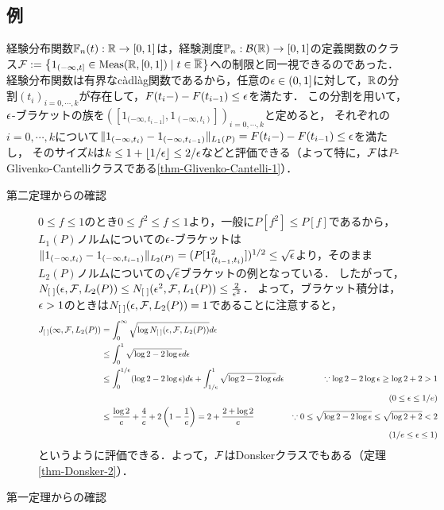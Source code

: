 \documentclass[uplatex,dvipdfmx]{jsreport}
\begin{document}
\subsection{例}

\begin{example}[区間の定義関数クラス]
    経験分布関数$\mathbb{F}_n(t):\mathbb{R}\to[0,1]$は，経験測度$\mathbb{P}_n:\mathcal{B}(\mathbb{R})\to[0,1]$の定義関数のクラス$\mathcal{F}:=\left\{1_{(-\infty,t]}\in\mathrm{Meas}(\mathbb{R},[0,1])\mid t\in\overline{\mathbb{R}}\right\}$への制限と同一視できるのであった．
    経験分布関数は有界なcàdlàg関数であるから，任意の$\epsilon\in(0,1]$に対して，$\mathbb{R}$の分割$(t_i)_{i=0,\cdots,k}$が存在して，$F(t_i-)-F(t_{i-1})\le\epsilon$を満たす．
    この分割を用いて，$\epsilon$-ブラケットの族を$([1_{(-\infty,t_{i-1}]},1_{(-\infty,t_i)}])_{i=0,\cdots,k}$と定めると，
    それぞれの$i=0,\cdots,k$について$\|1_{(-\infty,t_i)}-1_{(-\infty,t_{i-1})}\|_{L_1(P)}=F(t_i-)-F(t_{i-1})\le\epsilon$を満たし，
    そのサイズ$k$は$k\le 1+\lfloor1/\epsilon\rfloor\le2/\epsilon$などと評価できる（よって特に，$\mathcal{F}$は$P$-Glivenko-Cantelliクラスである\ref{thm-Glivenko-Cantelli-1}）．
    \begin{description}
        \item[第二定理からの確認] 
    $0\le f\le 1$のとき$0\le f^2\le f\le 1$より，一般に$P[f^2]\le P[f]$であるから，
    $L_1(P)$ノルムについての$\epsilon$-ブラケットは$\|1_{(-\infty,t_i)}-1_{(-\infty,t_{i-1})}\|_{L_2(P)}=(P[1_{(t_{i-1},t_i)}^2])^{1/2}\le\sqrt{\epsilon}$より，そのまま$L_2(P)$ノルムについての$\sqrt{\epsilon}$ブラケットの例となっている．
    したがって，$N_{[\;]}(\epsilon,\mathcal{F},L_2(P))\le N_{[\;]}(\epsilon^2,\mathcal{F},L_1(P))\le\frac{2}{\epsilon^2}$．
    よって，ブラケット積分は，$\epsilon>1$のときは$N_{[\;]}(\epsilon,\mathcal{F},L_2(P))=1$であることに注意すると，
    \begin{align*}
        J_{[\;]}(\infty,\mathcal{F},L_2(P))&=\int^\infty_0\sqrt{\log N_{[\;]}(\epsilon,\mathcal{F},L_2(P))}d\epsilon\\
        &\le\int^{1}_0\sqrt{\log 2-2\log\epsilon}d\epsilon\\
        &\le\int^{1/e}_0(\log 2-2\log\epsilon)d\epsilon+\int^1_{1/e}\sqrt{\log 2-2\log\epsilon}d\epsilon&\because \log 2-2\log\epsilon\ge\log 2+2>1\\ &&(0\le\epsilon\le 1/e)\\
        &\le\frac{\log 2}{e}+\frac{4}{e}+2\left(1-\frac{1}{e}\right)=2+\frac{2+\log2}{e}&\because0\le\sqrt{\log2-2\log\epsilon}\le\sqrt{\log2+2}<2\\ &&(1/e\le\epsilon\le1)\\
    \end{align*}
    というように評価できる．よって，$\mathcal{F}$はDonskerクラスでもある（定理\ref{thm-Donsker-2}）．
    \item[第一定理からの確認]

\end{description}
\end{example}
\end{document}
